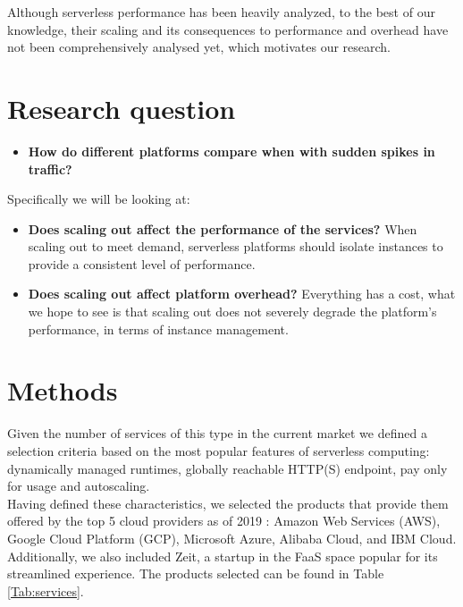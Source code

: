 \documentclass[11pt]{article}
\begin{document}
Although serverless performance has been heavily analyzed,
to the best of our knowledge, their scaling and its consequences to performance
and overhead have not been comprehensively analysed yet, which motivates our research.


\section{Research question}

\begin{itemize}
\item \textbf{How do different platforms compare when with sudden spikes in traffic?}
\end{itemize}

Specifically we will be looking at:

\begin{itemize}

\item \textbf{Does scaling out affect the performance of the services?}
When scaling out to meet demand,
serverless platforms should isolate instances
to provide a consistent level of performance.

\item \textbf{Does scaling out affect platform overhead?}
Everything has a cost,
what we hope to see is that scaling out does not severely degrade the platform's performance,
in terms of instance management.
\end{itemize}


\section{Methods}
\label{methods}

Given the number of services of this type in the current market we defined a selection criteria based on the most popular features \cite{popular1} of serverless computing: dynamically managed runtimes, globally reachable HTTP(S) endpoint, pay only for usage and autoscaling. \\

Having defined these characteristics, we selected the products that provide them offered by the top 5 cloud providers as of 2019 \cite{hh}: Amazon Web Services (AWS), Google Cloud Platform (GCP), Microsoft Azure, Alibaba Cloud, and IBM Cloud. Additionally, we also included Zeit, a startup in the FaaS space popular for its streamlined experience. The products selected can be found in Table \ref{Tab:services}. \\
\end{document}
